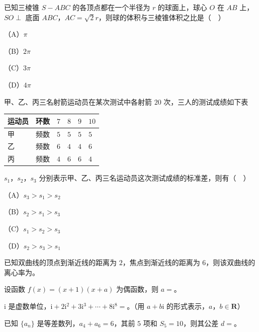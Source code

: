 \begin{question}
已知三棱锥 $S-ABC$ 的各顶点都在一个半径为 $r$ 的球面上，球心 $O$ 在 $AB$ 上，$SO\perp$ 底面 $ABC$，$AC=\sqrt2r$，则球的体积与三棱锥体积之比是（　）

（A）$\pi$

（B）$2\pi$

（C）$3\pi$

（D）$4\pi$

\end{question}
\begin{question}
甲、乙、丙三名射箭运动员在某次测试中各射箭 $20$ 次，三人的测试成绩如下表

\begin{center}
\begin{tabular}{llllll}
\toprule
运动员 & 环数 & $7$ & $8$ & $9$ & $10$ \\
\midrule
甲 & 频数 & $5$ & $5$ & $5$ & $5$ \\
乙 & 频数 & $6$ & $4$ & $4$ & $6$ \\
丙 & 频数 & $4$ & $6$ & $6$ & $4$ \\
\bottomrule
\end{tabular}
\end{center}

$s_1$，$s_2$，$s_3$ 分别表示甲、乙、丙三名运动员这次测试成绩的标准差，则有（　）

（A）$s_3>s_1>s_2$

（B）$s_2>s_1>s_3$

（C）$s_1>s_2>s_3$

（D）$s_2>s_3>s_1$

\end{question}

\begin{question}
已知双曲线的顶点到渐近线的距离为 $2$，焦点到渐近线的距离为 $6$，则该双曲线的离心率为\gkblank{}。

\end{question}
\begin{question}
设函数 $f(x)=(x+1)(x+a)$ 为偶函数，则 $a=$\gkblank{}。

\end{question}
\begin{question}
$\mathrm i$ 是虚数单位，$\mathrm i+2\mathrm i^2+3\mathrm i^3+\cdots+8\mathrm i^8=$\gkblank{}。（用 $a+b\mathrm i$ 的形式表示，$a$，$b\in\mathbf R$）

\end{question}
\begin{question}
已知 $\{a_n\}$ 是等差数列，$a_4+a_6=6$，其前 $5$ 项和 $S_5=10$，则其公差 $d=$\gkblank{}。

\end{question}

